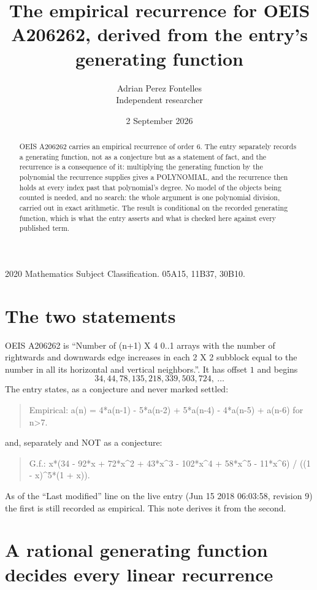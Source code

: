 \documentclass[11pt,a4paper]{article}
\title{The empirical recurrence for OEIS A206262, derived from the entry's generating function}
\author{Adrian Perez Fontelles\\ \small Independent researcher}
\date{2 September 2026}
\theoremstyle{plain}
\theoremstyle{definition}
\begin{document}
\maketitle

\begin{abstract}
OEIS A206262 carries an empirical recurrence of order $6$. The entry separately records a
generating function, not as a conjecture but as a statement of fact, and the recurrence is a
consequence of it: multiplying the generating function by the polynomial the recurrence
supplies gives a POLYNOMIAL, and the recurrence then holds at every index past that
polynomial's degree. No model of the objects being counted is needed, and no search: the
whole argument is one polynomial division, carried out in exact arithmetic. The result is
conditional on the recorded generating function, which is what the entry asserts and what is
checked here against every published term.
\end{abstract}

\noindent\small 2020 Mathematics Subject Classification. 05A15, 11B37, 30B10.\normalsize

\section{The two statements}

OEIS A206262 is ``Number of (n+1) X 4 0..1 arrays with the number of rightwards and downwards edge increases in each 2 X 2 subblock equal to the number in all its horizontal and vertical neighbors.''. It has offset $1$ and begins
\[
34, 44, 78, 135, 218, 339, 503, 724,\ \dots
\]
The entry states, as a conjecture and never marked settled:
\begin{quote}
Empirical: a(n) = 4*a(n-1) - 5*a(n-2) + 5*a(n-4) - 4*a(n-5) + a(n-6) for n>7.
\end{quote}
and, separately and NOT as a conjecture:
\begin{quote}
G.f.: x*(34 - 92*x + 72*x\^{}2 + 43*x\^{}3 - 102*x\^{}4 + 58*x\^{}5 - 11*x\^{}6) / ((1 - x)\^{}5*(1 + x)).
\end{quote}
As of the ``Last modified'' line on the live entry (Jun 15 2018 06:03:58, revision 9) the first is still
recorded as empirical. This note derives it from the second.

\section{A rational generating function decides every linear recurrence}
\end{document}

